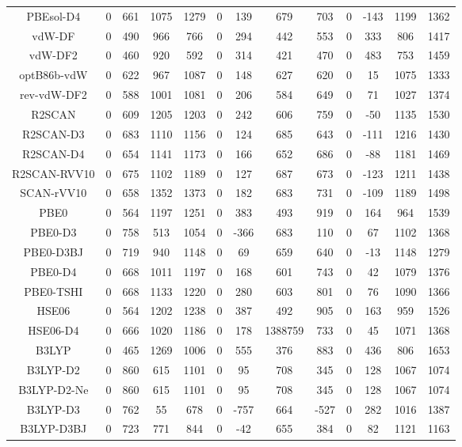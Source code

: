\begin{table}[ht]
\begin{tabular}{ccccccccccccc}
PBEsol-D4 & 0 & 661 & 1075 & 1279 & 0 & 139 & 679 & 703 & 0 & -143 & 1199 & 1362 \\ 
vdW-DF & 0 & 490 & 966 & 766 & 0 & 294 & 442 & 553 & 0 & 333 & 806 & 1417 \\ 
vdW-DF2 & 0 & 460 & 920 & 592 & 0 & 314 & 421 & 470 & 0 & 483 & 753 & 1459 \\ 
optB86b-vdW & 0 & 622 & 967 & 1087 & 0 & 148 & 627 & 620 & 0 & 15 & 1075 & 1333 \\ 
rev-vdW-DF2 & 0 & 588 & 1001 & 1081 & 0 & 206 & 584 & 649 & 0 & 71 & 1027 & 1374 \\ 
R2SCAN & 0 & 609 & 1205 & 1203 & 0 & 242 & 606 & 759 & 0 & -50 & 1135 & 1530 \\ 
R2SCAN-D3 & 0 & 683 & 1110 & 1156 & 0 & 124 & 685 & 643 & 0 & -111 & 1216 & 1430 \\ 
R2SCAN-D4 & 0 & 654 & 1141 & 1173 & 0 & 166 & 652 & 686 & 0 & -88 & 1181 & 1469 \\ 
R2SCAN-RVV10 & 0 & 675 & 1102 & 1189 & 0 & 127 & 687 & 673 & 0 & -123 & 1211 & 1438 \\ 
SCAN-rVV10 & 0 & 658 & 1352 & 1373 & 0 & 182 & 683 & 731 & 0 & -109 & 1189 & 1498 \\ 
PBE0 & 0 & 564 & 1197 & 1251 & 0 & 383 & 493 & 919 & 0 & 164 & 964 & 1539 \\ 
PBE0-D3 & 0 & 758 & 513 & 1054 & 0 & -366 & 683 & 110 & 0 & 67 & 1102 & 1368 \\ 
PBE0-D3BJ & 0 & 719 & 940 & 1148 & 0 & 69 & 659 & 640 & 0 & -13 & 1148 & 1279 \\ 
PBE0-D4 & 0 & 668 & 1011 & 1197 & 0 & 168 & 601 & 743 & 0 & 42 & 1079 & 1376 \\ 
PBE0-TSHI & 0 & 668 & 1133 & 1220 & 0 & 280 & 603 & 801 & 0 & 76 & 1090 & 1366 \\ 
HSE06 & 0 & 564 & 1202 & 1238 & 0 & 387 & 492 & 905 & 0 & 163 & 959 & 1526 \\ 
HSE06-D4 & 0 & 666 & 1020 & 1186 & 0 & 178 & 1388759 & 733 & 0 & 45 & 1071 & 1368 \\ 
B3LYP & 0 & 465 & 1269 & 1006 & 0 & 555 & 376 & 883 & 0 & 436 & 806 & 1653 \\ 
B3LYP-D2 & 0 & 860 & 615 & 1101 & 0 & 95 & 708 & 345 & 0 & 128 & 1067 & 1074 \\ 
B3LYP-D2-Ne & 0 & 860 & 615 & 1101 & 0 & 95 & 708 & 345 & 0 & 128 & 1067 & 1074 \\ 
B3LYP-D3 & 0 & 762 & 55 & 678 & 0 & -757 & 664 & -527 & 0 & 282 & 1016 & 1387 \\ 
B3LYP-D3BJ & 0 & 723 & 771 & 844 & 0 & -42 & 655 & 384 & 0 & 82 & 1121 & 1163 \\ 

\end{tabular}
\end{table}
